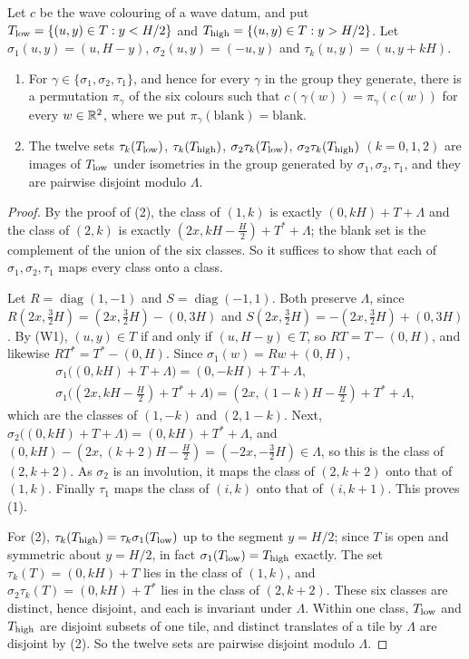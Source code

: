 \documentclass[11pt,colorlinks]{charlie}
\begin{document}
\begin{lemma}[Symmetries]\label{lem:symmetry}
Let $c$ be the wave colouring of a wave datum, and put $T_{\rm low}=\{(u,y)\in T:y<H/2\}$ and $T_{\rm high}=\{(u,y)\in T:y>H/2\}$. Let $\sigma_1(u,y)=(u,H-y)$, $\sigma_2(u,y)=(-u,y)$ and $\tau_k(u,y)=(u,y+kH)$.
\begin{enumerate}
\item For $\gamma\in\{\sigma_1,\sigma_2,\tau_1\}$, and hence for every $\gamma$ in the group they generate, there is a permutation $\pi_\gamma$ of the six colours such that $c(\gamma(w))=\pi_\gamma(c(w))$ for every $w\in\mathbb{R}^2$, where we put $\pi_\gamma(\text{blank})=\text{blank}$.
\item The twelve sets $\tau_k(T_{\rm low})$, $\tau_k(T_{\rm high})$, $\sigma_2\tau_k(T_{\rm low})$, $\sigma_2\tau_k(T_{\rm high})$ $(k=0,1,2)$ are images of $T_{\rm low}$ under isometries in the group generated by $\sigma_1,\sigma_2,\tau_1$, and they are pairwise disjoint modulo $\Lambda$.
\end{enumerate}
\end{lemma}

\begin{proof}
By the proof of (2), the class of $(1,k)$ is exactly $(0,kH)+T+\Lambda$ and the class of $(2,k)$ is exactly $(2x,kH-\tfrac H2)+T^*+\Lambda$; the blank set is the complement of the union of the six classes. So it suffices to show that each of $\sigma_1,\sigma_2,\tau_1$ maps every class onto a class.

Let $R=\operatorname{diag}(1,-1)$ and $S=\operatorname{diag}(-1,1)$. Both preserve $\Lambda$, since $R(2x,\tfrac32H)=(2x,\tfrac32H)-(0,3H)$ and $S(2x,\tfrac32H)=-(2x,\tfrac32H)+(0,3H)$. By (W1), $(u,y)\in T$ if and only if $(u,H-y)\in T$, so $RT=T-(0,H)$, and likewise $RT^*=T^*-(0,H)$. Since $\sigma_1(w)=Rw+(0,H)$,
\begin{gather*}
 \sigma_1\big((0,kH)+T+\Lambda\big)=(0,-kH)+T+\Lambda,\\
 \sigma_1\big((2x,kH-\tfrac H2)+T^*+\Lambda\big)=(2x,(1-k)H-\tfrac H2)+T^*+\Lambda,
\end{gather*}
which are the classes of $(1,-k)$ and $(2,1-k)$. Next, $\sigma_2\big((0,kH)+T+\Lambda\big)=(0,kH)+T^*+\Lambda$, and $(0,kH)-(2x,(k+2)H-\tfrac H2)=(-2x,-\tfrac32H)\in\Lambda$, so this is the class of $(2,k+2)$. As $\sigma_2$ is an involution, it maps the class of $(2,k+2)$ onto that of $(1,k)$. Finally $\tau_1$ maps the class of $(i,k)$ onto that of $(i,k+1)$. This proves (1).

For (2), $\tau_k(T_{\rm high})=\tau_k\sigma_1(T_{\rm low})$ up to the segment $y=H/2$; since $T$ is open and symmetric about $y=H/2$, in fact $\sigma_1(T_{\rm low})=T_{\rm high}$ exactly. The set $\tau_k(T)=(0,kH)+T$ lies in the class of $(1,k)$, and $\sigma_2\tau_k(T)=(0,kH)+T^*$ lies in the class of $(2,k+2)$. These six classes are distinct, hence disjoint, and each is invariant under $\Lambda$. Within one class, $T_{\rm low}$ and $T_{\rm high}$ are disjoint subsets of one tile, and distinct translates of a tile by $\Lambda$ are disjoint by (2). So the twelve sets are pairwise disjoint modulo $\Lambda$.
\end{proof}
\end{document}
